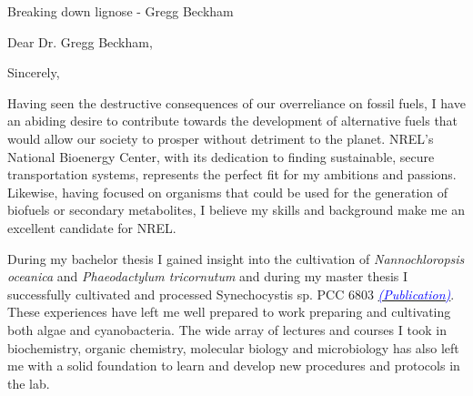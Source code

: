\documentclass[11pt,a4paper,sans]{moderncv}
\begin{document}
Breaking down lignose - Gregg Beckham







\thispagestyle{titlepage}

\date{\today}
\opening{Dear Dr. Gregg Beckham,}
\closing{Sincerely,}
\makelettertitle
\begin{spacing}{1.15}

Having seen the destructive consequences of our overreliance on fossil fuels, I have an abiding desire to contribute towards the development of alternative fuels that would allow our society to prosper without detriment to the planet. NREL's National Bioenergy Center, with its dedication to finding sustainable, secure transportation systems, represents the perfect fit for my ambitions and passions. Likewise, having focused on organisms that could be used for the generation of biofuels or secondary metabolites, I believe my skills and background make me an excellent candidate for NREL.\par\vspace*{1mm}

During my bachelor thesis I gained insight into the cultivation of \textit{Nannochloropsis oceanica} and \textit{Phaeodactylum tricornutum} and during my master thesis I successfully cultivated and processed Synechocystis sp. PCC 6803 {\href{https://www.ncbi.nlm.nih.gov/pubmed/29517395}{\textcolor{blue}{{\textit{(Publication)}}}}}. These experiences have left me well prepared to work preparing and cultivating both algae and cyanobacteria. The wide array of lectures and courses I took in biochemistry, organic chemistry, molecular biology and microbiology has also left me with a solid foundation to learn and develop new procedures and protocols in the lab.\par\vspace*{1mm}


\end{spacing}
\end{document}
